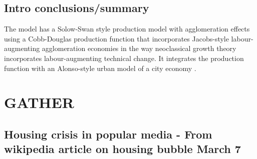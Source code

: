 \section{Intro conclusions/summary}
The model has a Solow-Swan style production model with agglomeration effects using a \gls{Cobb-Douglas} production function that incorporates Jacobs-style labour-augmenting agglomeration economies %
in the way neoclassical growth theory incorporates labour-augmenting technical change.
It integrates the production function with an Alonso-style urban model of a city economy \cite{alonsoTheoryUrbanLand1960}.


\chapter{GATHER}
\section{Housing crisis in popular media - From wikipedia article on housing bubble March 7}



